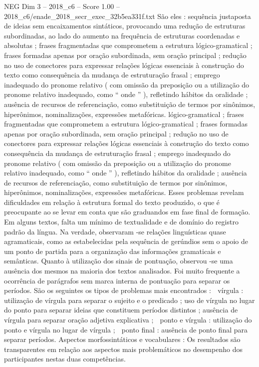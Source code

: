 \begin{textsample}{NEG Dim 3 – 2018\_c6 – Score 1.00 – 2018\_c6/enade\_2018\_secr\_exec\_32b5ea331f.txt}
São eles : sequência justaposta de ideias sem encaixamentos sintáticos, provocando uma redução de estruturas subordinadas, ao lado do aumento na frequência de estruturas coordenadas e absolutas ; frases fragmentadas que comprometem a estrutura lógico-gramatical ; frases formadas apenas por oração subordinada, sem oração principal ; redução no uso de conectores para expressar relações lógicas essenciais à construção do texto como consequência da mudança de estruturação frasal ; emprego inadequado do pronome relativo ( com omissão da preposição ou a utilização do pronome relativo inadequado, como “ onde ” ), refletindo hábitos da oralidade ; ausência de recursos de referenciação, como substituição de termos por sinônimos, hiperônimos, nominalizações, expressões metafóricas. lógico-gramatical ; frases fragmentadas que comprometem a estrutura lógico-gramatical ; frases formadas apenas por oração subordinada, sem oração principal ; redução no uso de conectores para expressar relações lógicas essenciais à construção do texto como consequência da mudança de estruturação frasal ; emprego inadequado do pronome relativo ( com omissão da preposição ou a utilização do pronome relativo inadequado, como “ onde ” ), refletindo hábitos da oralidade ; ausência de recursos de referenciação, como substituição de termos por sinônimos, hiperônimos, nominalizações, expressões metafóricas.
Esses problemas revelam dificuldades em relação à estrutura formal do texto produzido, o que é preocupante ao se levar em conta que são graduandos em fase final de formação.
Em alguns textos, falta um mínimo de textualidade e de domínio do registro padrão da língua.
Na verdade, observaram -se relações linguísticas quase agramaticais, como as estabelecidas pela sequência de gerúndios sem o apoio de um ponto de partida para a organização das informações gramaticais e semânticas.
Quanto à utilização dos sinais de pontuação, observou -se uma ausência dos mesmos na maioria dos textos analisados.
Foi muito frequente a ocorrência de parágrafos sem marca interna de pontuação para separar os períodos.
São os seguintes os tipos de problemas mais encontrados :  vírgula : utilização de vírgula para separar o sujeito e o predicado ; uso de vírgula no lugar do ponto para separar ideias que constituem períodos distintos ; ausência de vírgula para separar oração adjetiva explicativa ;  ponto e vírgula : utilização do ponto e vírgula no lugar de vírgula ;  ponto final : ausência de ponto final para separar períodos.
Aspectos morfossintáticos e vocabulares : Os resultados são transparentes em relação aos aspectos mais problemáticos no desempenho dos participantes nestas duas competências.

\end{textsample}
